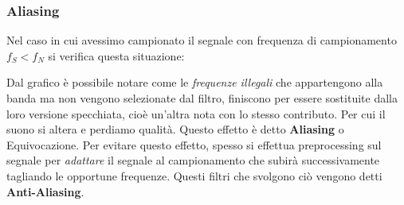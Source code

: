 \subsubsection{Aliasing}
Nel caso in cui avessimo campionato il segnale con frequenza di campionamento $f_S < f_N$ si verifica questa situazione:\\
\begin{center}
\end{center}
Dal grafico è possibile notare come le \textit{frequenze illegali} che appartengono alla banda ma non vengono selezionate dal filtro,
finiscono per essere sostituite dalla loro versione specchiata, cioè un'altra nota con lo stesso contributo. Per cui il suono si altera
e perdiamo qualità. Questo effetto è detto \textbf{Aliasing} o Equivocazione.
Per evitare questo effetto, spesso si effettua preprocessing sul segnale per \textit{adattare} il segnale al campionamento che subirà successivamente
tagliando le opportune frequenze. Questi filtri che svolgono ciò vengono detti \textbf{Anti-Aliasing}.
